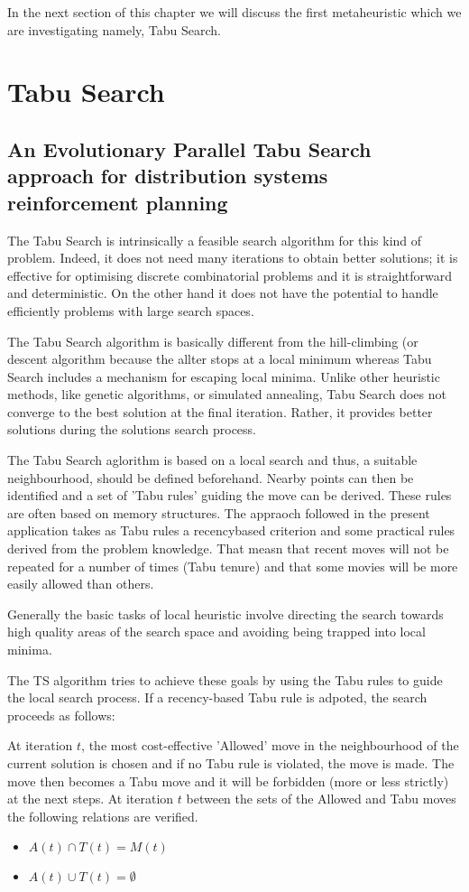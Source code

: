 In the next section of this chapter we will discuss the first metaheuristic which we are investigating namely, Tabu Search.
\section{Tabu Search}
\subsection{An Evolutionary Parallel Tabu Search approach for distribution systems reinforcement planning}
The Tabu Search is intrinsically a feasible search algorithm for this kind of problem. Indeed, it does not need many iterations to obtain better solutions; it is effective for optimising discrete combinatorial problems and it is straightforward and deterministic. On the other hand it does not have the potential to handle efficiently problems with large search spaces.

The Tabu Search algorithm is basically different from the hill-climbing (or descent algorithm because the allter stops at a local minimum whereas Tabu Search includes a mechanism for escaping local minima. Unlike other heuristic methods, like genetic algorithms, or simulated annealing, Tabu Search does not converge to the best solution at the final iteration. Rather, it provides better solutions during the solutions search process.

The Tabu Search aglorithm is based on a local search and thus, a suitable neighbourhood, should be defined beforehand. Nearby points can then be identified and a set of 'Tabu rules' guiding the move can be derived. These rules are often based on memory structures. The appraoch followed in the present application takes as Tabu rules a recencybased criterion and some practical rules derived from the problem knowledge. That measn that recent moves will not be repeated for a number of times (Tabu tenure) and that some movies will be more easily allowed than others.

Generally the basic tasks of local heuristic involve directing the search towards high quality areas of the search space and avoiding being trapped into local minima.

The TS algorithm tries to achieve these goals by using the Tabu rules to guide the local search process. If a recency-based Tabu rule is adpoted, the search proceeds as follows:

At iteration $t$, the most cost-effective 'Allowed' move in the neighbourhood of the current solution is chosen and if no Tabu rule is violated, the move is made. The move then becomes a Tabu move and it will be forbidden (more or less strictly) at the next steps. At iteration $t$ between the sets of the Allowed and Tabu moves the following relations are verified.
\begin{itemize}
\item $A(t) \cap T(t) = M(t)$
\item $A(t) \cup T(t) = \emptyset$
\end{itemize}

